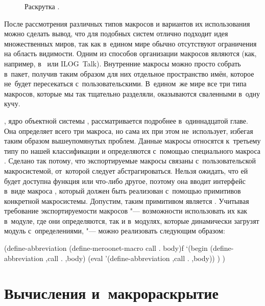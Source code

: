 \begin{figure}\centering

\caption{Раскрутка \protect\Meroon.}
\label{macros/scope/pic:bootstrap}
\end{figure}

После рассмотрения различных типов макросов и вариантов их использования можно
сделать вывод, что для подобных систем отлично подходит идея множественных
миров, так как в~едином мире обычно отсутствуют ограничения на область
видимости. Одним из способов организации макросов являются  (как,
например, в~{\CommonLisp} или ILOG~Talk). Внутренние макросы можно просто
собрать в~пакет, получив таким образом для них отдельное пространство имён,
которое не~будет пересекаться с~пользовательскими. В~едином~же мире все три
типа макросов, которые мы так тщательно разделяли, оказываются сваленными в~одну
кучу.

{\Meroonet}, ядро объектной системы {\Meroon}, рассматривается подробнее
в~одиннадцатой главе. Она определяет всего три макроса, но сама их при этом
не~использует, избегая таким образом вышеупомянутых проблем. Данные макросы
относятся к~третьему типу по нашей классификации и определяются с~помощью
специального макроса . Сделано так потому, что
экспортируемые макросы связаны с~пользовательской макросистемой, от~которой
{\Meroonet} следует абстрагироваться. Нельзя ожидать, что ей будет доступна
функция  или что-либо другое, поэтому она вводит интерфейс
в~виде макроса , который должен быть реализован
с~помощью примитивов конкретной макросистемы. Допустим, таким примитивом
является . Учитывая требование экспортируемости макросов
"--- возможности использовать их как в~модуле, где они определяются, так и
в~модулях, которые динамически загрузят модуль с~определениями, "---
 можно реализовать следующим образом:

\begin{code:lisp}
(define-abbreviation (define-meroonet-macro call . body)f
  `(begin (define-abbreviation ,call . ,body)
          (eval '(define-abbreviation ,call . ,body)) ) )
\end{code:lisp}


\section{Вычисления и~макрораскрытие}\label{macros/sect:eval-and-expand}

